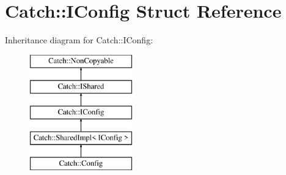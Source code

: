 \hypertarget{struct_catch_1_1_i_config}{\section{Catch\-:\-:I\-Config Struct Reference}
\label{struct_catch_1_1_i_config}
}
Inheritance diagram for Catch\-:\-:I\-Config\-:\begin{figure}[H]
\begin{center}
\leavevmode
\includegraphics[height=5.000000cm]{struct_catch_1_1_i_config}
\end{center}
\end{figure}
